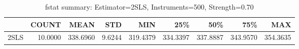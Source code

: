 \begin{table}[ht]
\centering
\caption{fstat summary: Estimator=2SLS, Instruments=500, Strength=0.70}
\begin{tabular}{lrrrrrrrr}
\toprule
 & COUNT & MEAN & STD & MIN & 25\% & 50\% & 75\% & MAX \\
\midrule
2SLS & 10.0000 & 338.6960 & 9.6244 & 319.4379 & 334.3397 & 337.8887 & 343.9570 & 354.3635 \\
\bottomrule
\end{tabular}
\end{table}
